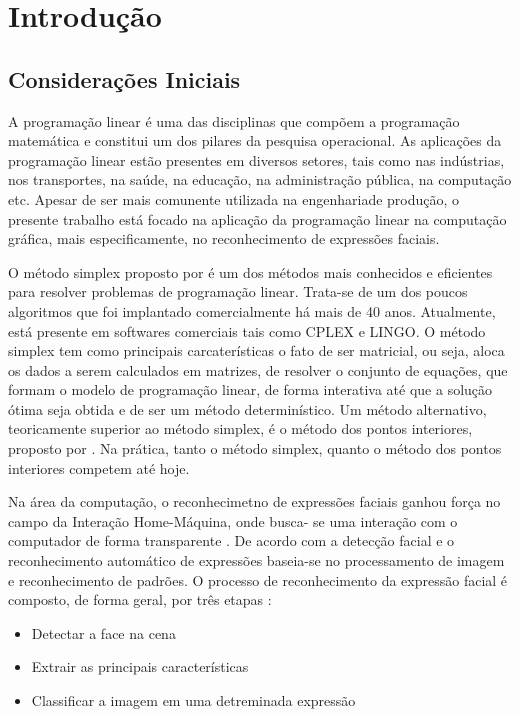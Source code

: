 \chapter{Introdução}

\section{Considerações Iniciais}
A programação linear é uma das disciplinas que compõem a programação matemática e constitui um dos pilares da pesquisa operacional. As aplicações da programação linear estão presentes em diversos setores, tais como nas indústrias, nos transportes, na saúde, na educação, na administração pública, na computação etc. Apesar de ser mais comunente utilizada na engenhariade produção, o presente trabalho está focado na aplicação da programação linear na computação gráfica, mais especificamente, no reconhecimento de expressões faciais.

O método simplex proposto por  é um dos métodos mais conhecidos e eficientes para resolver problemas de programação linear. Trata-se de um dos poucos algoritmos que foi implantado comercialmente há mais de 40 anos. Atualmente, está presente em softwares comerciais tais como CPLEX e LINGO. O método simplex tem como principais carcaterísticas o fato de ser matricial, ou seja, aloca os dados a serem calculados em matrizes, de resolver o conjunto de equações, que formam o modelo de programação linear, de forma interativa até que a solução ótima seja obtida e de ser um método determinístico. Um método alternativo, teoricamente superior ao método simplex, é o método dos pontos interiores, proposto por . Na prática, tanto o método simplex, quanto o método dos pontos interiores competem até hoje.  

Na área da computação, o reconhecimetno de expressões faciais ganhou força no campo da Interação Home-Máquina, onde busca- se uma interação com o computador de forma transparente \cite{Elizabeth}. De acordo com  a detecção facial e o reconhecimento automático de expressões baseia-se no processamento de imagem e reconhecimento de padrões. O processo de reconhecimento da expressão facial é composto, de forma geral, por três etapas \cite{Elizabeth}:
\begin{itemize}
\item Detectar a face na cena
\item Extrair as principais características
\item Classificar a imagem em uma detreminada expressão
\end{itemize}

